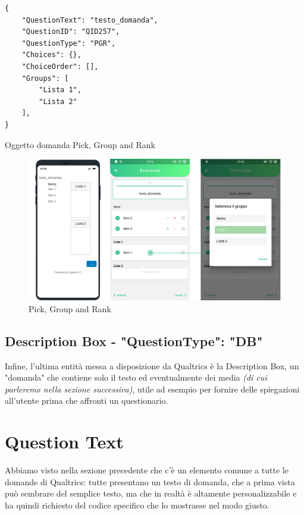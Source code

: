 \newpage
\begin{json}
\begin{verbatim}
{
    "QuestionText": "testo_domanda",
    "QuestionID": "QID257",
    "QuestionType": "PGR",
    "Choices": {},
    "ChoiceOrder": [],
    "Groups": [
        "Lista 1",
        "Lista 2"
    ],
}
\end{verbatim}
\caption{Oggetto domanda Pick, Group and Rank}
\label{json:PGR}
\end{json}

\begin{figure}[h!]
\centering
\includegraphics[width=\textwidth]{img/PGR}
\caption{Pick, Group and Rank}
\label{fig:PGR}
\end{figure}

\subsection{Description Box - "QuestionType": "DB"}
Infine, l'ultima entità messa a disposizione da Qualtrics è la Description Box, un "domanda" che contiene solo il testo ed eventualmente dei media \textit{(di cui parleremo nella sezione successiva)}, utile ad esempio per fornire delle spiegazioni all'utente prima che affronti un questionario.

\section{Question Text}
Abbiamo visto nella sezione precedente che c'è un elemento comune a tutte le domande di Qualtrics: tutte presentano un testo di domanda, che a prima vista può sembrare del semplice testo, ma che in realtà è altamente personalizzabile e ha quindi richiesto del codice specifico che lo mostrasse nel modo giusto.

